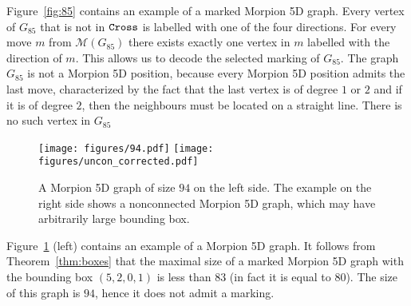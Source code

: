 Figure~\ref{fig:85} contains an example of a marked Morpion 5D graph. 
Every vertex of $G_{85}$ that is not in $\texttt{Cross}$ is labelled with one of the four directions. 
For every move $m$ from $\mathcal{M}(G_{85})$ there exists exactly one vertex in $m$ 
  labelled with the direction of $m$.
This allows us to decode the selected marking of $G_{85}$.
The graph $G_{85}$ is not a Morpion 5D position,  because every Morpion 5D position admits the last move, characterized by the fact that the last vertex is of degree $1$ or $2$ and if it is
of degree $2$, then the neighbours must be located on a straight line. 
There is no such vertex in $G_{85}$

\begin{figure}
  \centering
    \texttt{[image: figures/94.pdf]}
    \texttt{[image: figures/uncon\_corrected.pdf]}
  \caption{
    A Morpion 5D graph of size $94$ on the left side. 
    The example on the right side shows a nonconnected Morpion 5D graph,
      which may have arbitrarily large bounding box.
  }
  \label{fig:uncon}
\end{figure}

Figure~\ref{fig:uncon} (left) contains an example of a Morpion 5D graph.
It follows from Theorem~\ref{thm:boxes} that the maximal size of a marked Morpion 5D graph with the 
  bounding box $(5,2,0,1)$ is less than $83$ (in fact it is equal to $80$).
The size of this graph is $94$, hence it does not admit a marking.

